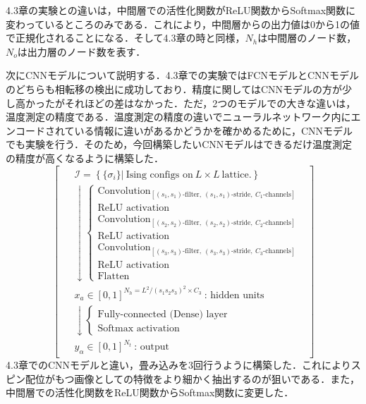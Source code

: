 \documentclass[a4paper,11pt]{jsreport}
\begin{document}
4.3章の実験との違いは，中間層での活性化関数がReLU関数からSoftmax関数に変わっているところのみである．これにより，中間層からの出力値は0から1の値で正規化されることになる．そして4.3章の時と同様，$N_h$は中間層のノード数，$N_o$は出力層のノード数を表す．\par
次にCNNモデルについて説明する．4.3章での実験ではFCNモデルとCNNモデルのどちらも相転移の検出に成功しており．精度に関してはCNNモデルの方が少し高かったがそれほどの差はなかった．ただ，2つのモデルでの大きな違いは，温度測定の精度である．温度測定の精度の違いでニューラルネットワーク内にエンコードされている情報に違いがあるかどうかを確かめるために，CNNモデルでも実験を行う．そのため，今回構築したいCNNモデルはできるだけ温度測定の精度が高くなるように構築した．
\begin{equation}
  \begin{bmatrix}
    \begin{aligned}
       & \mathcal{I} = \left\{ \{ \sigma_i \} \Big| \ \text{Ising configs on} \ L \times L \ \text{lattice.} \right\} \\
       & \downarrow
      \begin{cases}
        \text{Convolution}_{[(s_1,s_1)\text{-filter}, \ (s_1,s_1)\text{-stride}, \ C_1\text{-channels}]} \\
        \text{ReLU activation} \\
        \text{Convolution}_{[(s_2,s_2)\text{-filter}, \ (s_2,s_2)\text{-stride}, \ C_2\text{-channels}]} \\
        \text{ReLU activation} \\
        \text{Convolution}_{[(s_3,s_3)\text{-filter}, \ (s_3,s_3)\text{-stride}, \ C_3\text{-channels}]} \\
        \text{ReLU activation} \\
        \text{Flatten}
      \end{cases} \\
       & x_a \in [0,1]^{N_h = L^2/(s_1s_2s_3)^2 \times C_3} \ \text{: hidden units} \\
       & \downarrow
      \begin{cases}
        \text{Fully-connected (Dense) layer} \\
        \text{Softmax activation}
      \end{cases} \\
       & y_{\alpha} \in [0,1]^{N_t} \ \text{: output}
    \end{aligned}
  \end{bmatrix}
\end{equation} \label{conv model}
4.3章でのCNNモデルと違い，畳み込みを3回行うように構築した．これによりスピン配位がもつ画像としての特徴をより細かく抽出するのが狙いである．また，中間層での活性化関数をReLU関数からSoftmax関数に変更した．\par
\end{document}
